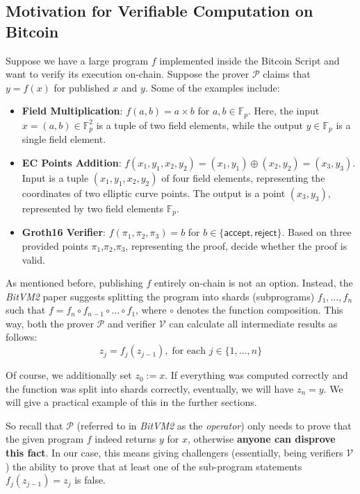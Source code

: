 \documentclass{iacrtrans}
\begin{document}
\subsection{Motivation for Verifiable Computation on Bitcoin}
Suppose we have a large program $f$ implemented inside the Bitcoin Script and
want to verify its execution on-chain. Suppose the prover $\mathcal{P}$ claims
that ${y} = f({x})$ for published ${x}$ and ${y}$. Some of the examples include:
\begin{itemize}
  \item \textbf{Field Multiplication}: $f(a,b) = a \times b$ for $a,b \in
    \mathbb{F}_p$. Here, the input ${x}=(a,b) \in \mathbb{F}_p^2$ is a tuple of
    two field elements, while the output $y \in \mathbb{F}_p$ is a single field
    element.
  \item \textbf{EC Points Addition}: $f(x_1,y_1,x_2,y_2) = (x_1,y_1) \oplus
    (x_2,y_2) = (x_3,y_3)$. Input is a tuple $(x_1,y_1,x_2,y_2)$ of four field
    elements, representing the coordinates of two elliptic curve points. The
    output is a point $(x_3,y_3)$, represented by two field elements
    $\mathbb{F}_p$.
  \item \textbf{Groth16 Verifier}: $f(\pi_1,\pi_2,\pi_3) = b$ for $b \in
    \{\mathsf{accept}, \mathsf{reject}\}$. Based on three provided points
    $\pi_1$,$\pi_2$,$\pi_3$, representing the proof, decide whether the proof is
    valid.
\end{itemize}

As mentioned before, publishing $f$ entirely on-chain is not an option. Instead,
the \textit{BitVM2} paper suggests splitting the program into shards
(subprograms) $f_1,\dots,f_n$ such
that $f=f_n \circ f_{n-1} \circ \dots \circ f_1$, where $\circ$ denotes the
function composition. This way, both the prover $\mathcal{P}$ and verifier
$\mathcal{V}$ can calculate all intermediate results as follows:
\begin{equation*}
  {z}_j = f_j({z}_{j-1}), \; \text{for each $j \in \{1,\dots,n\}$}
\end{equation*}

Of course, we additionally set ${z}_0 := {x}$. If everything was computed
correctly and the function was split into shards correctly, eventually, we will
have ${z}_n = {y}$. We will give a practical example of this in the further
sections.

So recall that $\mathcal{P}$ (referred to in \textit{BitVM2} as the
\textit{operator})
only needs to prove that the given program $f$ indeed returns ${y}$ for \({x}\),
otherwise \textbf{anyone can disprove this fact}. In our case, this means giving
challengers (essentially, being verifiers $\mathcal{V}$) the ability to prove
that at least one of the sub-program statements \(f_j({z}_{j-1}) = {z}_j\) is
false.
\end{document}
